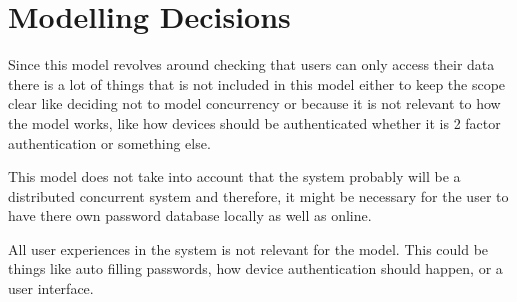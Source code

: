 \section{Modelling Decisions}
Since this model revolves around checking that users can only access their data
there is a lot of things that is not included in this model either to keep the
scope clear like deciding not to model concurrency or because it is not
relevant to how the model works, like how devices should be authenticated
whether it is 2 factor authentication or something else.

This model does not take into account that the system probably will be a
distributed concurrent system and therefore, it might be necessary for the user
to have there own password database locally as well as online.

All user experiences in the system is not relevant for the model. This could be
things like auto filling passwords, how device authentication should happen, or
a user interface.